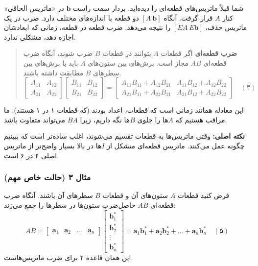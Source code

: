 \documentclass[12pt, a4paper]{book}
\begin{document}
	شما قبلاً ماتریس‌های قطعه‌ای را دیده‌اید. بردار سمت راست $\mathbf{b}$ در «ماتریس الحاقی» کنار $A$ قرار گرفت. آنگاه $[A \ \mathbf{b}]$ دو قطعه با اندازه‌های مختلف دارد. ضرب در یک ماتریس حذف، $[EA \ E\mathbf{b}]$ را نتیجه می‌دهد. ضرب قطعه در قطعه، زمانی که ابعادشان اجازه دهد، مشکلی ندارد.
	
	\begin{quote}
		\textbf{ضرب قطعه‌ای} اگر قطعات $A$ بتوانند در قطعات $B$ ضرب شوند، آنگاه ضرب قطعه‌ای $AB$ مجاز است. برش‌های بین ستون‌های $A$ باید با برش‌های بین سطرهای $B$ مطابقت داشته باشند.
		\[
		\begin{bmatrix} A_{11} & A_{12} \\ A_{21} & A_{22} \end{bmatrix}
		\begin{bmatrix} B_{11} & B_{12} \\ B_{21} & B_{22} \end{bmatrix}
		= \begin{bmatrix} A_{11}B_{11}+A_{12}B_{21} & A_{11}B_{12}+A_{12}B_{22} \\ A_{21}B_{11}+A_{22}B_{21} & A_{21}B_{12}+A_{22}B_{22} \end{bmatrix} \quad (۴)
		\]
	\end{quote}
	این معادله همانند زمانی است که قطعات، اعداد بودند (که قطعات ۱ در ۱ هستند). ما مراقب هستیم که $A$ها را جلوی $B$ها نگه داریم، زیرا $BA$ می‌تواند متفاوت باشد.
	
	\textbf{نکته اصلی:} وقتی ماتریس‌ها به قطعات تقسیم می‌شوند، اغلب ساده‌تر است که ببینیم چگونه عمل می‌کنند. ماتریس قطعه‌ای متشکل از $I$ها در بالا بسیار واضح‌تر از ماتریس اصلی ۴ در ۶ است.
	
	\subsubsection*{مثال ۳ (حالت خاص مهم)}
	فرض کنید قطعات $A$ ستون‌های آن و قطعات $B$ سطرهای آن باشند. آنگاه ضرب قطعه‌ای $AB$ حاصل‌ضرب ستون‌ها در سطرها را جمع می‌زند:
	\[ AB = \begin{bmatrix} \mathbf{a}_1 & \mathbf{a}_2 & \dots & \mathbf{a}_n \end{bmatrix} \begin{bmatrix} \mathbf{b}_1^* \\ \mathbf{b}_2^* \\ \vdots \\ \mathbf{b}_n^* \end{bmatrix} = \mathbf{a}_1\mathbf{b}_1^* + \mathbf{a}_2\mathbf{b}_2^* + \dots + \mathbf{a}_n\mathbf{b}_n^* \quad (۵) \]
	این همان قاعده ۴ برای ضرب ماتریس‌هاست.
	
\end{document}
